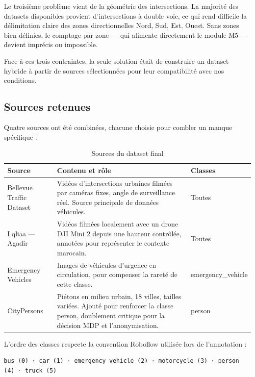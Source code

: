Le troisième problème vient de la géométrie
des intersections. La majorité des datasets
disponibles provient d'intersections à double
voie, ce qui rend difficile la délimitation
claire des zones directionnelles Nord, Sud,
Est, Ouest. Sans zones bien définies, le
comptage par zone — qui alimente directement
le module M5 — devient imprécis ou impossible.

Face à ces trois contraintes, la seule
solution était de construire un dataset
hybride à partir de sources sélectionnées
pour leur compatibilité avec nos conditions.

\subsection{Sources retenues}

Quatre sources ont été combinées, chacune
choisie pour combler un manque spécifique :

\begin{table}[H]
\centering
\caption{Sources du dataset final}
\begin{tabularx}{\textwidth}{lXl}
\toprule
\textbf{Source} &
\textbf{Contenu et rôle} &
\textbf{Classes} \\
\midrule
Bellevue Traffic Dataset &
Vidéos d'intersections urbaines
filmées par caméras fixes, angle
de surveillance réel. Source
principale de données véhicules. &
Toutes \\

Lqliaa — Agadir &
Vidéos filmées localement avec
un drone DJI Mini 2 depuis une
hauteur contrôlée, annotées pour
représenter le contexte marocain. &
Toutes \\

Emergency Vehicles &
Images de véhicules d'urgence
en circulation, pour compenser
la rareté de cette classe. &
emergency\_vehicle \\

CityPersons &
Piétons en milieu urbain,
18 villes, tailles variées.
Ajouté pour renforcer la classe
person, doublement critique pour
la décision MDP et l'anonymisation. &
person \\
\bottomrule
\end{tabularx}
\label{tab:dataset_sources}
\end{table}

L'ordre des classes respecte la convention
Roboflow utilisée lors de l'annotation :

\begin{center}
\texttt{bus (0) · car (1) ·
emergency\_vehicle (2) ·
motorcycle (3) · person (4) ·
truck (5)}
\end{center}

